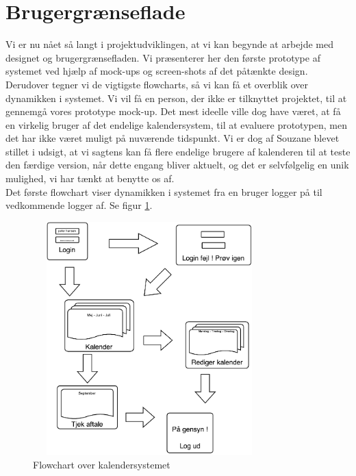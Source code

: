 \documentclass[12pt]{article}   %
\begin{document}
\section{Brugergrænseflade}
Vi er nu nået så langt i projektudviklingen, at vi kan begynde at arbejde med designet og brugergrænsefladen. Vi præsenterer her den første prototype af systemet ved hjælp af mock-ups og screen-shots af det påtænkte design. Derudover tegner vi de vigtigste flowcharts, så vi kan få et overblik over dynamikken i systemet. Vi vil få en person, der ikke er tilknyttet projektet, til at gennemgå vores prototype mock-up. Det mest ideelle ville dog have været, at få en virkelig bruger af det endelige kalendersystem, til at evaluere prototypen, men det har ikke været muligt på nuværende tidspunkt. Vi er dog af Souzane blevet stillet i udsigt, at vi sagtens kan få flere endelige brugere af kalenderen til at teste den færdige version, når dette engang bliver aktuelt, og det er selvfølgelig en unik mulighed, vi har tænkt at benytte os af. \\
Det første flowchart viser dynamikken i systemet fra en bruger logger på til vedkommende logger af. Se figur \ref{fig:flow1}.\\

\begin{figure}[!ht]
\begin{center}
\includegraphics[width=9cm, height=9cm]{flow1.pdf}
\caption{Flowchart over kalendersystemet}
\label{fig:flow1}
\end{center}
\end{figure}
\end{document}
